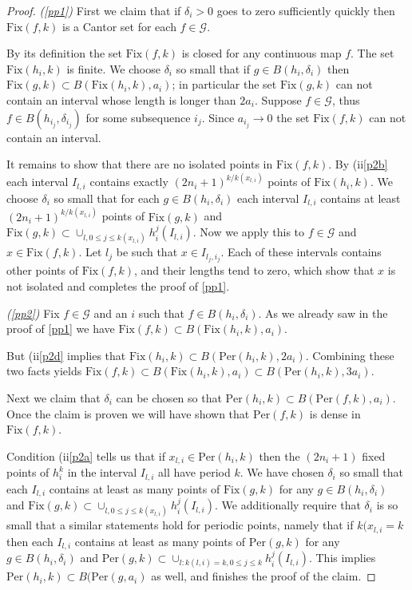 \documentclass[12pt, a4paper]{amsart}
\def\le{\leqslant}
\def\per{\mathrm{Per}}
\newcommand{\?}{{\bf ???}}
\newcommand{\fix}{\mathrm{Fix}}
\begin{document}
\begin{proof}
 {\it (\ref{pp1})} First we claim that if $\delta_i > 0$ goes to zero sufficiently quickly then $\fix(f,k)$ is a Cantor set for each $f \in \mathcal{G}$.  
 
By its definition the set $\fix(f,k)$ is 
closed for any continuous map $f$.
The set $\fix(h_i,k)$ is finite.
We choose $\delta_i$ so small that if $g \in B(h_i,\delta_i)$ then $\fix(g,k) \subset  B(\fix(h_i,k),a_i)$;  in particular the set
$\fix(g,k)$ can not contain an interval whose length is longer than $2a_i$.
Suppose $f \in \mathcal{G}$,  thus $f \in B(h_{i_j},\delta_{i_j})$  for some subsequence $i_j$.
Since $a_{i _j}\to 0$ the set $\fix(f,k)$ can not contain an interval.

It remains to show that 
there are no isolated points in $\fix(f,k)$. 
By (ii\ref{p2b} each interval $I_{l,i}$ contains exactly
$ (2n_i+1)^{k/k(x_{l,i})}$ points of $\fix(h_i,k)$.
 We choose $\delta_i$ so small
that  
 for each $g \in B(h_i,\delta_i)$
each interval $I_{l,i}$ contains at least $ (2n_i+1)^{k/k(x_{l,i})}$ points of $\fix(g,k)$  and
 $\fix(g,k) \subset \cup_{l,0 \le j \le k(x_{l,i})} h_i^j(I_{l,i})$.
Now we apply  this to $f \in \mathcal{G}$ and $x \in \fix(f,k)$. Let $l_j$ be such that $x \in I_{{l_j},i_j}$. Each of these intervals contains other points of $\fix(f,k)$, and their
lengths tend to zero, which show that $x$ is not isolated and 
 completes the proof of \eqref{pp1}.

{\it (\ref{pp2})} Fix $f\in \mathcal{G}$  
and an $i$ such that 
$f \in B(h_i,\delta_i)$. 
As we already saw in the proof of  \eqref{pp1}  we have  $\fix(f,k) \subset  B(\fix(h_i,k),a_i)$. 

But (ii\eqref{p2d} implies that
$\fix(h_i,k)\subset B(\per(h_i,k),2a_i)$.
Combining these two facts yields 
$\fix(f,k) \subset  B(\fix(h_i,k),a_i) \subset B(\per(h_i,k),3a_i)$.

Next we claim that $\delta_i$ can be chosen so that $\per(h_i,k) \subset B(\per(f,k),a_i)$. Once the claim is proven we will have shown that $\per(f,k)$ is dense in $\fix(f,k)$.

Condition  (ii\ref{p2a} tells us that  if $x_{l,i} \in \per(h_i,k)$  then the $(2n_i+1)$ fixed points of $h_i^k$ in the interval $I_{l,i}$   all have period $k$.
We have chosen $\delta_i$ so small
that each $I_{l,i}$ contains at least as many points of $\fix(g,k)$  for any $g \in B(h_i,\delta_i)$ and
 $\fix(g,k) \subset \cup_{l,0 \le j \le k(x_{l,i})} h_i^j(I_{l,i})$.
 We additionally require that $\delta_i$ is so small that  a similar statements hold for periodic points, namely that 
 if $k(x_{l,i}=k$ then each $I_{l,i}$ contains at least as many points of $\per(g,k)$  for any $g \in B(h_i,\delta_i)$ and 
  $\per(g,k) \subset \cup_{l : k(l,i) = k ,0 \le j \le k} h_i^j(I_{l,i})$.
This implies $\per(h_i,k) \subset  B(\per(g,a_i)$ as well, and finishes the proof of the claim.


\end{proof}
\end{document}
